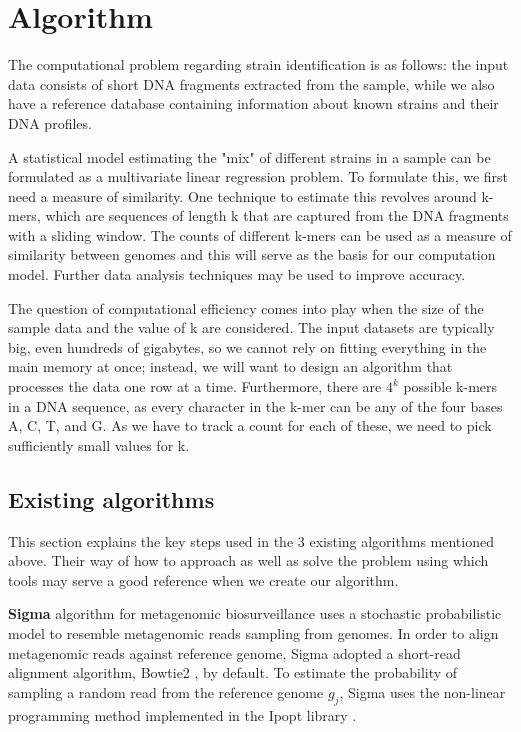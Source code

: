 \documentclass{article}
\begin{document}
\section {Algorithm}
The computational problem regarding strain identification is as follows: the input data consists of short DNA fragments extracted from the sample, while we also have a reference database containing information about known strains and their DNA profiles. 

A statistical model estimating the "mix" of different strains in a sample can be formulated as a multivariate linear regression problem. To formulate this, we first need a measure of similarity. One technique to estimate this revolves around k-mers, which are sequences of length k that are captured from the DNA fragments with a sliding window. The counts of different k-mers can be used as a measure of similarity between genomes and this will serve as the basis for our computation model. Further data analysis techniques may be used to improve accuracy.

The question of computational efficiency comes into play when the size of the sample data and the value of k are considered. The input datasets are typically big, even hundreds of gigabytes, so we cannot rely on fitting everything in the main memory at once; instead, we will want to design an algorithm that processes the data one row at a time. Furthermore, there are $4^k$ possible k-mers in a DNA sequence, as every character in the k-mer can be any of the four bases A, C, T, and G. As we have to track a count for each of these, we need to pick sufficiently small values for k.


\subsection{Existing algorithms}
This section explains the key steps used in the 3 existing algorithms mentioned above. Their way of how to approach as well as solve the problem using which tools may serve a good reference when we create our algorithm.

\textbf{Sigma} algorithm \cite{ahn2015sigma} for metagenomic biosurveillance uses a stochastic probabilistic model to resemble metagenomic reads sampling from genomes. In order to align metagenomic reads against reference genome, Sigma adopted a short-read alignment algorithm, Bowtie2 \cite{Bowtie}, by default. To estimate the probability of sampling a random read from the reference genome $g_j$, Sigma uses the non-linear programming method implemented in the Ipopt library \cite{Ipopt}. 
\end{document}
